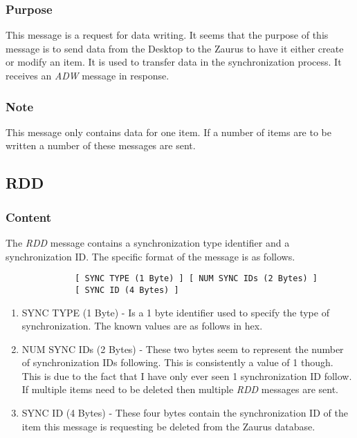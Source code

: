             \subsubsection{Purpose}

            This message is a request for data writing. It seems that the
            purpose of this message is to send data from the Desktop to the
            Zaurus to have it either create or modify an item. It is used to
            transfer data in the synchronization process. It receives an
            \emph{ADW} message in response.

            \subsubsection{Note}

            This message only contains data for one item. If a number of items
            are to be written a number of these messages are sent.

        \subsection{RDD}

            \subsubsection{Content}

            The \emph{RDD} message contains a synchronization type identifier
            and a synchronization ID. The specific format of the message is as
            follows.

            \begin{verbatim}
              [ SYNC TYPE (1 Byte) ] [ NUM SYNC IDs (2 Bytes) ]
              [ SYNC ID (4 Bytes) ]
            \end{verbatim}

            \begin{enumerate}
            \item SYNC TYPE (1 Byte) - Is a 1 byte identifier used to specify
              the type of synchronization. The known values are as 
              follows in hex.

              \synctypes

            \item NUM SYNC IDs (2 Bytes) - These two bytes seem to represent
              the number of synchronization IDs following. This is
              consistently a value of 1 though. This is due to the fact that I
              have only ever seen 1 synchronization ID follow. If multiple
              items need to be deleted then multiple \emph{RDD} messages are
              sent.

            \item SYNC ID (4 Bytes) - These four bytes contain the
              synchronization ID of the item this message is requesting be
              deleted from the Zaurus database.
            \end{enumerate}
            
